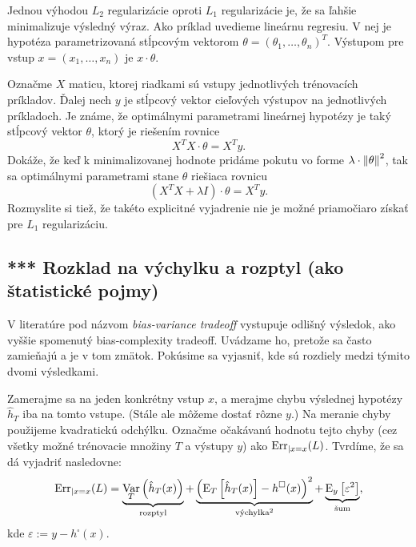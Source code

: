 \begin{exercise}
  Jednou výhodou $L_2$ regularizácie oproti $L_1$ regularizácie je, že
  sa ľahšie minimalizuje výsledný výraz. Ako príklad uvedieme lineárnu
  regresiu. V nej je hypotéza parametrizovaná stĺpcovým vektorom
  $\theta = (\theta_1, \ldots, \theta_n)^T$. Výstupom pre vstup
  $x = (x_1, \ldots, x_n)$ je $x \cdot \theta$. 
  
  Označme $X$ maticu, ktorej riadkami sú vstupy jednotlivých trénovacích
  príkladov. Ďalej nech $y$ je stĺpcový vektor cieľových výstupov na
  jednotlivých príkladoch. Je známe, že optimálnymi parametrami
  lineárnej hypotézy je taký stĺpcový vektor $\theta$, ktorý je riešením
  rovnice
  $$X^T X \cdot \theta = X^T y.$$
  Dokáže, že keď k minimalizovanej hodnote pridáme pokutu vo forme
  $\lambda \cdot \left\lVert\theta\right\rVert^2$, tak sa optimálnymi parametrami stane
  $\theta$ riešiaca rovnicu
  $$(X^T X + \lambda I) \cdot \theta = X^T y.$$
  Rozmyslite si tiež, že takéto explicitné vyjadrenie nie je možné
  priamočiaro získať pre $L_1$ regularizáciu.
\end{exercise}

\subsection{*** Rozklad na výchylku a rozptyl (ako štatistické pojmy)}
\label{biasvariance2}

V literatúre pod názvom \emph{bias-variance tradeoff} vystupuje odlišný
výsledok, ako vyššie spomenutý bias-complexity tradeoff. Uvádzame ho,
pretože sa často zamieňajú a je v tom zmätok. Pokúsime sa vyjasniť, kde
sú rozdiely medzi týmito dvomi výsledkami.

\begin{theorem}
  Zamerajme sa na jeden konkrétny vstup $x$, a merajme chybu výslednej
  hypotézy $\hat{h}_T$ iba na tomto vstupe. (Stále ale môžeme dostať
  rôzne $y$.) Na meranie chyby použijeme kvadratickú odchýlku. Označme
  očakávanú hodnotu tejto chyby (cez všetky možné trénovacie
  množiny $T$ a výstupy $y$) ako $\mathrm{Err}_{|x=x}(L)$. Tvrdíme, že
  sa dá vyjadriť nasledovne:
  $$
    \mathrm{Err}_{|x=x}(L)
      = \underbrace{\operatorname*{\mathrm{Var}}_T \left( \hat{h}_T(x) \right)}_{\text{\normalfont rozptyl}}
      + \underbrace{\left( \mathrm{E}_T \left[ \hat{h}_T(x) \right] - h^\square(x) \right)^2}_{\text{\normalfont výchylka}^2}
      + \underbrace{\mathrm{E}_y \left[ \varepsilon^2 \right]}_{\text{\normalfont šum}},
  $$
  kde $\varepsilon := y - h^\square(x)$.
\end{theorem}

